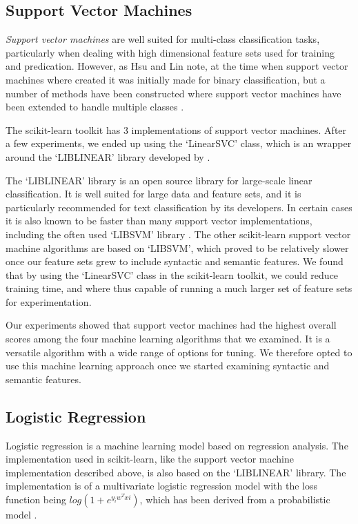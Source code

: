 \subsection{Support Vector Machines}

\textit{Support vector machines} are well suited for multi-class classification tasks, particularly when dealing with high dimensional feature sets used for training and predication. However, as Hsu and Lin note, at the time when support vector machines where created it was initially made for binary classification, but a number of methods have been constructed where support vector machines have been extended to handle multiple classes \cite{Hsu:02}.

The scikit-learn toolkit has 3 implementations of support vector machines. After a few experiments, we ended up using the `LinearSVC' class, which is an wrapper around the `LIBLINEAR' library developed by  .

The `LIBLINEAR' library is an open source library for large-scale linear classification. It is well suited for large data and feature sets, and it is particularly recommended for text classification by its developers. In certain cases it is also known to be faster than many support vector implementations, including the often used `LIBSVM' library \cite{liblinear}. The other scikit-learn support vector machine algorithms are based on `LIBSVM', which proved to be relatively slower once our feature sets grew to include syntactic and semantic features. We found that by using the `LinearSVC' class in the scikit-learn toolkit, we could reduce training time, and where thus capable of running a much larger set of feature sets for experimentation.

Our experiments showed that support vector machines had the highest overall scores among the four machine learning algorithms that we examined. It is a versatile algorithm with a wide range of options for tuning. We therefore opted to use this machine learning approach once we started examining syntactic and semantic features.

\subsection{Logistic Regression}

Logistic regression is a machine learning model based on regression analysis. The implementation used in scikit-learn, like the support vector machine implementation described above, is also based on the `LIBLINEAR' library. The implementation is of a multivariate logistic regression model with the loss function being $log(1+e^{y_iw^Txi})$, which has been derived from a probabilistic model \cite{liblinear}. 

